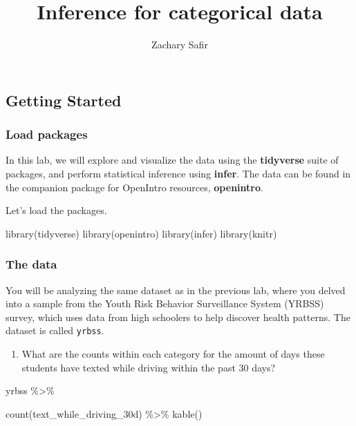 \documentclass[
]{article}
\title{Inference for categorical data}
\author{Zachary Safir}
\date{}
\newenvironment{Shaded}{\begin{snugshade}}{\end{snugshade}}
\newcommand{\FunctionTok}[1]{\textcolor[rgb]{0.00,0.00,0.00}{#1}}
\newcommand{\NormalTok}[1]{#1}
\newcommand{\SpecialCharTok}[1]{\textcolor[rgb]{0.00,0.00,0.00}{#1}}
\providecommand{\tightlist}{%
  \setlength{\itemsep}{0pt}\setlength{\parskip}{0pt}}
\begin{document}
\maketitle

\hypertarget{getting-started}{%
\subsection{Getting Started}\label{getting-started}}

\hypertarget{load-packages}{%
\subsubsection{Load packages}\label{load-packages}}

In this lab, we will explore and visualize the data using the
\textbf{tidyverse} suite of packages, and perform statistical inference
using \textbf{infer}. The data can be found in the companion package for
OpenIntro resources, \textbf{openintro}.

Let's load the packages.

\begin{Shaded}
\begin{Highlighting}[]
\FunctionTok{library}\NormalTok{(tidyverse)}
\FunctionTok{library}\NormalTok{(openintro)}
\FunctionTok{library}\NormalTok{(infer)}
\FunctionTok{library}\NormalTok{(knitr)}
\end{Highlighting}
\end{Shaded}

\hypertarget{the-data}{%
\subsubsection{The data}\label{the-data}}

You will be analyzing the same dataset as in the previous lab, where you
delved into a sample from the Youth Risk Behavior Surveillance System
(YRBSS) survey, which uses data from high schoolers to help discover
health patterns. The dataset is called \texttt{yrbss}.

\begin{enumerate}
\def\labelenumi{\arabic{enumi}.}
\tightlist
\item
  What are the counts within each category for the amount of days these
  students have texted while driving within the past 30 days?
\end{enumerate}

\begin{Shaded}
\begin{Highlighting}[]
\NormalTok{ yrbss }\SpecialCharTok{\%\textgreater{}\%}
  
\FunctionTok{count}\NormalTok{(text\_while\_driving\_30d) }\SpecialCharTok{\%\textgreater{}\%}
  \FunctionTok{kable}\NormalTok{()}
\end{Highlighting}
\end{Shaded}
\end{document}

